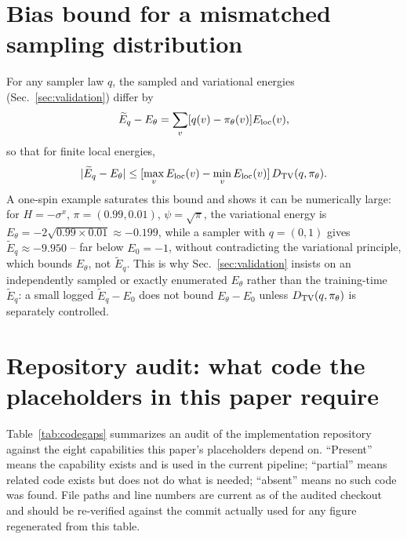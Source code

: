 \appendix

\section{Bias bound for a mismatched sampling distribution}
\label{app:bias}

For any sampler law $q$, the sampled and variational energies (Sec.~\ref{sec:validation}) differ by
\begin{equation}
\widetilde E_q-E_\theta=\sum_v[q(v)-\pi_\theta(v)]E_{\mathrm{loc}}(v),
\label{eq:bias}
\end{equation}
so that for finite local energies,
\begin{equation}
|\widetilde E_q-E_\theta|\le[\max_vE_{\mathrm{loc}}(v)-\min_vE_{\mathrm{loc}}(v)]\,D_{\mathrm{TV}}(q,\pi_\theta).
\label{eq:biasbound}
\end{equation}
A one-spin example saturates this bound and shows it can be numerically large: for $H=-\sigma^x$, $\pi=(0.99,0.01)$, $\psi=\sqrt\pi$, the variational energy is $E_\theta=-2\sqrt{0.99\times0.01}\approx-0.199$, while a sampler with $q=(0,1)$ gives $\widetilde E_q\approx-9.950$ -- far below $E_0=-1$, without contradicting the variational principle, which bounds $E_\theta$, not $\widetilde E_q$. This is why Sec.~\ref{sec:validation} insists on an independently sampled or exactly enumerated $E_\theta$ rather than the training-time $\widetilde E_q$: a small logged $\widetilde E_q-E_0$ does not bound $E_\theta-E_0$ unless $D_{\mathrm{TV}}(q,\pi_\theta)$ is separately controlled.

\section{Repository audit: what code the placeholders in this paper require}
\label{sec:code-gaps}

Table~\ref{tab:codegaps} summarizes an audit of the implementation repository against the eight capabilities this paper's placeholders depend on. ``Present'' means the capability exists and is used in the current pipeline; ``partial'' means related code exists but does not do what is needed; ``absent'' means no such code was found. File paths and line numbers are current as of the audited checkout and should be re-verified against the commit actually used for any figure regenerated from this table.

